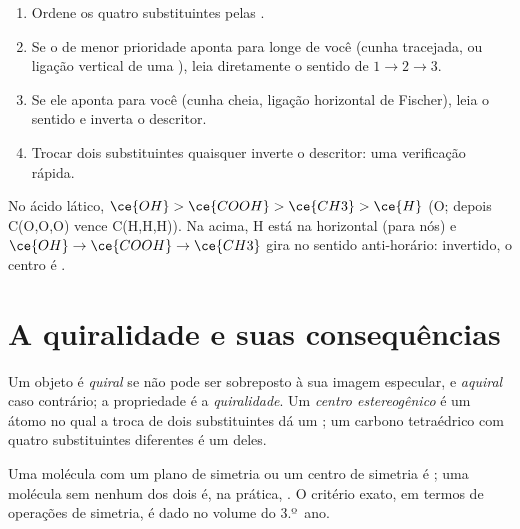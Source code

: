 \begin{method}\label{met:b1:stereochemistry-in-depth:cip}
\begin{enumerate}
  \item Ordene os quatro substituintes pelas .
  \item Se o de menor prioridade aponta para longe de você (cunha
        tracejada, ou ligação vertical de uma ), leia
        diretamente o sentido de $1 \to 2 \to 3$.
  \item Se ele aponta para você (cunha cheia, ligação horizontal de
        Fischer), leia o sentido e inverta o descritor.
  \item Trocar dois substituintes quaisquer inverte o descritor: uma
        verificação rápida.
\end{enumerate}
No ácido lático, $\ce{OH} > \ce{COOH} > \ce{CH3} > \ce{H}$ (O; depois
C(O,O,O) vence C(H,H,H)). Na  acima, H está na
horizontal (para nós) e $\ce{OH} \to \ce{COOH} \to \ce{CH3}$ gira no
sentido anti-horário: invertido, o centro é .
\end{method}

\section{A quiralidade e suas consequências}

\begin{definition}\label{def:b1:stereochemistry-in-depth:stereocentre}
Um objeto é \emph{quiral} se não pode ser sobreposto à
sua imagem especular, e \emph{aquiral} caso contrário; a
propriedade é a \emph{quiralidade}. Um \emph{centro
estereogênico} é um átomo no qual a troca de dois
substituintes dá um ; um carbono tetraédrico com quatro
substituintes diferentes é um deles.
\end{definition}

Uma molécula com um plano de simetria ou um centro de simetria é
; uma molécula sem nenhum dos dois é, na prática, . O
critério exato, em termos de operações de simetria, é dado no volume do
3.º~ano.

